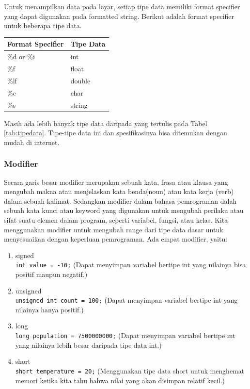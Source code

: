 Untuk menampilkan data pada layar, setiap tipe data memiliki format specifier yang dapat digunakan pada formatted string. Berikut adalah format specifier untuk beberapa tipe data.
\begin{center}
	\begin{tabular}{|l|l|}
		\hline
		\textbf{Format Specifier} & \textbf{Tipe Data} \\ \hline
		\%d or \%i      		  & int       		   \\ \hline
		\%f             		  & float     		   \\ \hline
		\%lf             		  & double   		   \\ \hline
		\%c             		  & char      		   \\ \hline
		\%s             		  & string   		   \\ \hline
	\end{tabular}
\end{center}
Masih ada lebih banyak tipe data daripada yang tertulis pada Tabel \ref{tab:tipedata}. Tipe-tipe data ini dan spesifikasinya bisa ditemukan dengan mudah di internet.

\subsubsection{Modifier}
Secara garis besar modifier merupakan sebuah kata, frasa atau klausa yang mengubah makna atau menjelaskan kata benda(noun) atau kata kerja (verb) dalam sebuah kalimat.
Sedangkan modifier dalam bahasa pemrograman dalah sebuah kata kunci atau keyword yang digunakan untuk mengubah perilaku atau sifat suatu elemen dalam program, seperti variabel, fungsi, atau kelas.
Kita menggunakan modifier untuk mengubah range dari tipe data dasar untuk menyesuaikan dengan keperluan pemrograman. Ada empat modifier, yaitu:
\begin{enumerate}
	\item signed \\
	      \verb|int value = -10;| (Dapat menyimpan variabel bertipe int yang nilainya bisa positif maupun negatif.)
	\item unsigned \\
	      \verb|unsigned int count = 100;|  (Dapat menyimpan variabel bertipe int yang nilainya hanya positif.)
	\item long \\
	      \verb|long population = 7500000000;| (Dapat menyimpan variabel bertipe int yang nilainya lebih besar daripada tipe data int.)
	\item short \\
	      \verb|short temperature = 20;| (Menggunakan tipe data short untuk menghemat memori ketika kita tahu bahwa nilai yang akan disimpan relatif kecil.)
\end{enumerate}


